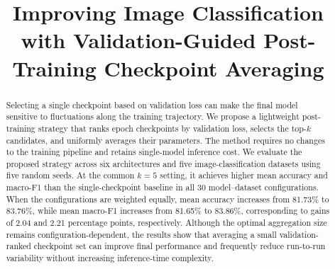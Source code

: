 \documentclass[runningheads]{llncs}
\begin{document}
\raggedbottom
\title{Improving Image Classification with Validation-Guided Post-Training Checkpoint Averaging}

\author{
}
%
\institute{
}

\maketitle              %

\begin{abstract}
  Selecting a single checkpoint based on validation loss can make the final
  model sensitive to fluctuations along the training trajectory. We propose a
  lightweight post-training strategy that ranks epoch checkpoints by validation
  loss, selects the top-$k$ candidates, and uniformly averages their parameters.
  The method requires no changes to the training pipeline and retains
  single-model inference cost. We evaluate the proposed strategy across six
  architectures and five image-classification datasets using five random seeds.
  At the common $k=5$ setting, it achieves higher mean accuracy and macro-F1
  than the single-checkpoint baseline in all 30 model--dataset configurations.
  When the configurations are weighted equally, mean accuracy increases from
  81.73\% to 83.76\%, while mean macro-F1 increases from 81.65\% to 83.86\%,
  corresponding to gains of 2.04 and 2.21 percentage points, respectively.
  Although the optimal aggregation size remains configuration-dependent, the
  results show that averaging a small validation-ranked checkpoint set can
  improve final performance and frequently reduce run-to-run variability
  without increasing inference-time complexity.
\end{abstract}
\end{document}
